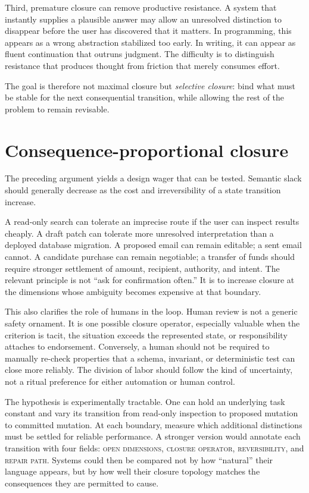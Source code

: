 \documentclass[11pt]{article}
\newcommand{\term}[1]{\textit{#1}}
\begin{document}
Third, premature closure can remove productive resistance. A system that instantly supplies a plausible answer may allow an unresolved distinction to disappear before the user has discovered that it matters. In programming, this appears as a wrong abstraction stabilized too early. In writing, it can appear as fluent continuation that outruns judgment. The difficulty is to distinguish resistance that produces thought from friction that merely consumes effort.

The goal is therefore not maximal closure but \term{selective closure}: bind what must be stable for the next consequential transition, while allowing the rest of the problem to remain revisable.

\section{Consequence-proportional closure}
The preceding argument yields a design wager that can be tested. Semantic slack should generally decrease as the cost and irreversibility of a state transition increase.

A read-only search can tolerate an imprecise route if the user can inspect results cheaply. A draft patch can tolerate more unresolved interpretation than a deployed database migration. A proposed email can remain editable; a sent email cannot. A candidate purchase can remain negotiable; a transfer of funds should require stronger settlement of amount, recipient, authority, and intent. The relevant principle is not ``ask for confirmation often.'' It is to increase closure at the dimensions whose ambiguity becomes expensive at that boundary.

This also clarifies the role of humans in the loop. Human review is not a generic safety ornament. It is one possible closure operator, especially valuable when the criterion is tacit, the situation exceeds the represented state, or responsibility attaches to endorsement. Conversely, a human should not be required to manually re-check properties that a schema, invariant, or deterministic test can close more reliably. The division of labor should follow the kind of uncertainty, not a ritual preference for either automation or human control.

The hypothesis is experimentally tractable. One can hold an underlying task constant and vary its transition from read-only inspection to proposed mutation to committed mutation. At each boundary, measure which additional distinctions must be settled for reliable performance. A stronger version would annotate each transition with four fields: \textsc{open dimensions}, \textsc{closure operator}, \textsc{reversibility}, and \textsc{repair path}. Systems could then be compared not by how ``natural'' their language appears, but by how well their closure topology matches the consequences they are permitted to cause.
\end{document}
